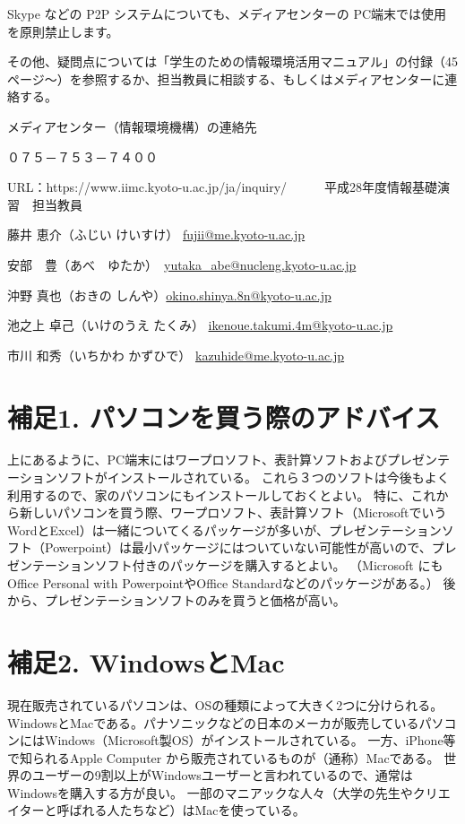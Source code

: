Skype などの P2P システムについても、メディアセンターの PC端末では使用を原則禁止します。

その他、疑問点については「学生のための情報環境活用マニュアル」の付録（45ページ～）を参照するか、担当教員に相談する、もしくはメディアセンターに連絡する。


メディアセンター（情報環境機構）の連絡先

０７５－７５３－７４００

URL：https://www.iimc.kyoto-u.ac.jp/ja/inquiry/
　
　
平成28年度情報基礎演習　担当教員

藤井 恵介（ふじい けいすけ）	\url{fujii@me.kyoto-u.ac.jp}

安部　豊（あべ　ゆたか）　\url{yutaka_abe@nucleng.kyoto-u.ac.jp}

沖野 真也（おきの しんや）\url{okino.shinya.8n@kyoto-u.ac.jp}

池之上 卓己（いけのうえ たくみ） \url{ikenoue.takumi.4m@kyoto-u.ac.jp}

市川 和秀（いちかわ かずひで） \url{kazuhide@me.kyoto-u.ac.jp}

\section{補足1. パソコンを買う際のアドバイス}
上にあるように、PC端末にはワープロソフト、表計算ソフトおよびプレゼンテーションソフトがインストールされている。
これら３つのソフトは今後もよく利用するので、家のパソコンにもインストールしておくとよい。
特に、これから新しいパソコンを買う際、ワープロソフト、表計算ソフト（MicrosoftでいうWordとExcel）は一緒についてくるパッケージが多いが、プレゼンテーションソフト（Powerpoint）は最小パッケージにはついていない可能性が高いので、プレゼンテーションソフト付きのパッケージを購入するとよい。
（Microsoft にもOffice Personal with PowerpointやOffice Standardなどのパッケージがある。）
後から、プレゼンテーションソフトのみを買うと価格が高い。

\section{補足2. WindowsとMac}
現在販売されているパソコンは、OSの種類によって大きく2つに分けられる。
WindowsとMacである。パナソニックなどの日本のメーカが販売しているパソコンにはWindows（Microsoft製OS）がインストールされている。
一方、iPhone等で知られるApple Computer から販売されているものが（通称）Macである。
世界のユーザーの9割以上がWindowsユーザーと言われているので、通常はWindowsを購入する方が良い。
一部のマニアックな人々（大学の先生やクリエイターと呼ばれる人たちなど）はMacを使っている。
